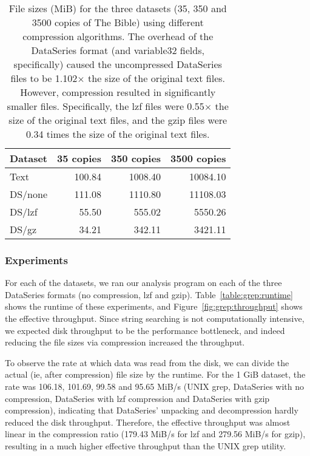 \begin{table*}
\centering
\begin{tabular}{|l|r|r|r|}\hline

Dataset           & 35 copies & 350 copies  & 3500 copies \\
\hline
Text              & 100.84 & 1008.40 & 10084.10   \\
DS/none           & 111.08 & 1110.80 & 11108.03   \\
DS/lzf            & 55.50  & 555.02  & 5550.26    \\
DS/gz             & 34.21  & 342.11  & 3421.11    \\
\hline
\end{tabular}


\caption{File sizes (MiB) for the three datasets (35, 350 and 3500 copies of The Bible) using different compression algorithms. The overhead of the DataSeries format (and variable32 fields, specifically) caused the uncompressed DataSeries files to be 1.102$\times$ the size of the original text files. However, compression resulted in significantly smaller files. Specifically, the lzf files were 0.55$\times$ the size of the original text files, and the gzip files were 0.34 times the size of the original text files.}

\label{table:grep:compression}
\end{table*}

\subsubsection{Experiments}

For each of the datasets, we ran our analysis program on each of the three DataSeries formats (no compression, lzf and gzip). Table~\ref{table:grep:runtime} shows the runtime of these experiments, and Figure~\ref{fig:grep:throughput} shows the effective throughput. Since string searching is not computationally intensive, we expected disk throughput to be the performance bottleneck, and indeed reducing the file sizes via compression increased the throughput. 

To observe the rate at which data was read from the disk, we can divide the actual (ie, after compression) file size by the runtime. For the 1 GiB dataset, the rate was 106.18, 101.69, 99.58 and 95.65 MiB/s (UNIX grep, DataSeries with no compression, DataSeries with lzf compression and DataSeries with gzip compression), indicating that DataSeries' unpacking and decompression hardly reduced the disk throughput. Therefore, the effective throughput was almost linear in the compression ratio (179.43 MiB/s for lzf and 279.56 MiB/s for gzip), resulting in a much higher effective throughput than the UNIX grep utility.

